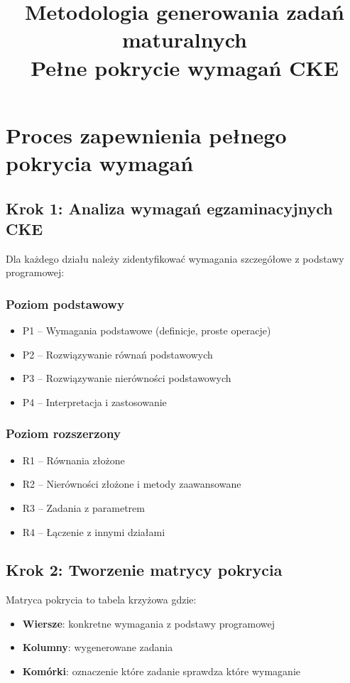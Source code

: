 \documentclass[12pt,a4paper]{article}
\title{Metodologia generowania zadań maturalnych\\
\large Pełne pokrycie wymagań CKE}
\author{}
\date{}
\begin{document}
\maketitle

\section{Proces zapewnienia pełnego pokrycia wymagań}

\subsection{Krok 1: Analiza wymagań egzaminacyjnych CKE}

Dla każdego działu należy zidentyfikować wymagania szczegółowe z podstawy programowej:

\subsubsection{Poziom podstawowy}
\begin{itemize}
    \item P1 -- Wymagania podstawowe (definicje, proste operacje)
    \item P2 -- Rozwiązywanie równań podstawowych
    \item P3 -- Rozwiązywanie nierówności podstawowych
    \item P4 -- Interpretacja i zastosowanie
\end{itemize}

\subsubsection{Poziom rozszerzony}
\begin{itemize}
    \item R1 -- Równania złożone
    \item R2 -- Nierówności złożone i metody zaawansowane
    \item R3 -- Zadania z parametrem
    \item R4 -- Łączenie z innymi działami
\end{itemize}

\subsection{Krok 2: Tworzenie matrycy pokrycia}

Matryca pokrycia to tabela krzyżowa gdzie:
\begin{itemize}
    \item \textbf{Wiersze}: konkretne wymagania z podstawy programowej
    \item \textbf{Kolumny}: wygenerowane zadania
    \item \textbf{Komórki}: oznaczenie które zadanie sprawdza które wymaganie
\end{itemize}
\end{document}
